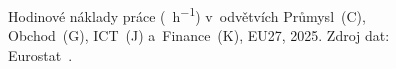 \def\strEuOdvetvoveMzdyMapaTitle{Hodinové náklady práce dle odvětví, EU27 (2025)}%
\def\strEuOdvetvoveMzdyMapaColorbarLabel{[\si{\pps\per\hour}]}%
\def\strEuOdvetvoveMzdyMapaCaption{Hodinové náklady práce (\si{\pps\per\hour}) v~odvětvích Průmysl~(C), Obchod~(G), \acs{ICT}~(J) a~Finance~(K), EU27, 2025. Zdroj dat: Eurostat~\cite{eurostat_lc_lci_lev_D1D4MD5_PPS_h}.}%
%

\providecommand\NudgeEuOdvetvoveMzdyMapaCz{0pt}%
\providecommand\NudgeEuOdvetvoveMzdyMapaAt{0pt}%
\providecommand\NudgeEuOdvetvoveMzdyMapaDe{0pt}%
\providecommand\NudgeEuOdvetvoveMzdyMapaDk{0pt}%
\providecommand\NudgeEuOdvetvoveMzdyMapaPl{0pt}%
\providecommand\NudgeEuOdvetvoveMzdyMapaSk{0pt}%
\begin{figure}[htb]
  \centering
  \resizebox{\linewidth}{!}{}
  \caption{\strEuOdvetvoveMzdyMapaCaption}
  \label{fig:eu_odvetvove_mzdy_mapa}
\end{figure}
